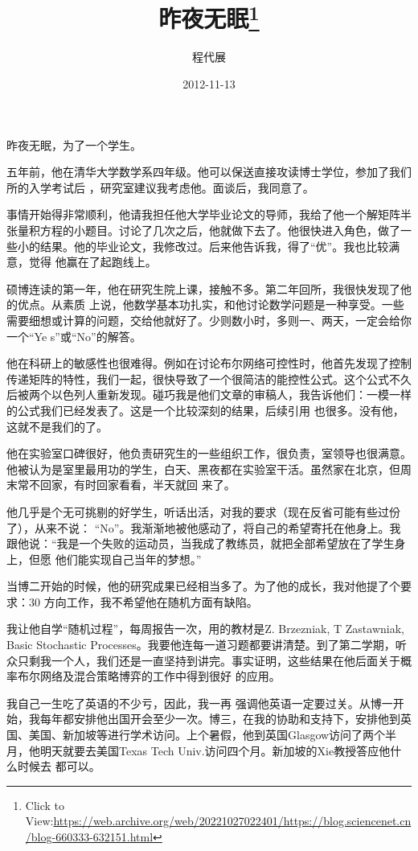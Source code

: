 \documentclass{article}
\title{昨夜无眠\footnote{Click to View:\url{https://web.archive.org/web/20221027022401/https://blog.sciencenet.cn/blog-660333-632151.html}}}
\author{程代展}
\date{2012-11-13}
\begin{document}

\maketitle


\Large


﻿昨夜无眠，为了一个学生。 

五年前，他在清华大学数学系四年级。他可以保送直接攻读博士学位，参加了我们所的入学考试后
，研究室建议我考虑他。面谈后，我同意了。 

事情开始得非常顺利，他请我担任他大学毕业论文的导师，我给了他一个解矩阵半张量积方程的小题目。讨论了几次之后，他就做下去了。他很快进入角色，做了一些小的结果。他的毕业论文，我修改过。后来他告诉我，得了“优”。我也比较满意，觉得
他赢在了起跑线上。 

硕博连读的第一年，他在研究生院上课，接触不多。第二年回所，我很快发现了他的优点。从素质
\newpage
上说，他数学基本功扎实，和他讨论数学问题是一种享受。一些需要细想或计算的问题，交给他就好了。少则数小时，多则一、两天，一定会给你一个“Ye
s”或“No”的解答。 

他在科研上的敏感性也很难得。例如在讨论布尔网络可控性时，他首先发现了控制传递矩阵的特性，我们一起，很快导致了一个很简洁的能控性公式。这个公式不久后被两个以色列人重新发现。碰巧我是他们文章的审稿人，我告诉他们：一模一样的公式我们已经发表了。这是一个比较深刻的结果，后续引用
也很多。没有他，这就不是我们的了。 

他在实验室口碑很好，他负责研究生的一些组织工作，很负责，室领导也很满意。他被认为是室里最用功的学生，白天、黑夜都在实验室干活。虽然家在北京，但周末常不回家，有时回家看看，半天就回
来了。 

他几乎是个无可挑剔的好学生，听话出活，对我的要求（现在反省可能有些过份了），从来不说：
\newpage
“No”。我渐渐地被他感动了，将自己的希望寄托在他身上。我跟他说：“我是一个失败的运动员，当我成了教练员，就把全部希望放在了学生身上，但愿
他们能实现自己当年的梦想。” 

当博二开始的时候，他的研究成果已经相当多了。为了他的成长，我对他提了个要求：30%
方向工作，我不希望他在随机方面有缺陷。 

我让他自学“随机过程”，每周报告一次，用的教材是Z. Brzezniak, T Zastawniak, Basic Stochastic Processes。我要他连每一道习题都要讲清楚。到了第二学期，听众只剩我一个人，我们还是一直坚持到讲完。事实证明，这些结果在他后面关于概率布尔网络及混合策略博弈的工作中得到很好
的应用。 

我自己一生吃了英语的不少亏，因此，我一再
\newpage
强调他英语一定要过关。从博一开始，我每年都安排他出国开会至少一次。博三，在我的协助和支持下，安排他到英国、美国、新加坡等进行学术访问。上个暑假，他到英国Glasgow访问了两个半月，他明天就要去美国Texas Tech Univ.访问四个月。新加坡的Xie教授答应他什么时候去
都可以。 
\end{document}
